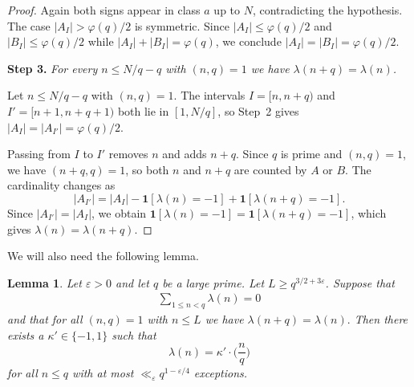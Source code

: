 \documentclass[11pt]{amsart}
\newtheorem{lemma}[theorem]{Lemma}
\begin{document}
\begin{proof}
Again both signs appear in class $a$ up to $N$,
contradicting the hypothesis.
The case $|A_I| > \varphi(q)/2$ is symmetric.
Since $|A_I| \leq \varphi(q)/2$ and $|B_I| \leq \varphi(q)/2$
while $|A_I| + |B_I| = \varphi(q)$,
we conclude $|A_I| = |B_I| = \varphi(q)/2$.

\medskip
\noindent\textbf{Step 3.}
\textit{For every $n \leq N/q - q$ with $(n,q) = 1$
we have $\lambda(n+q) = \lambda(n)$.}

\smallskip
Let $n \leq N/q - q$ with $(n, q) = 1$.
The intervals
$I = [n, n + q)$ and $I' = [n + 1, n + q + 1)$
both lie in $[1, N/q]$, so Step~2 gives
$|A_I| = |A_{I'}| = \varphi(q)/2$.

Passing from $I$ to $I'$ removes $n$ and adds $n + q$.
Since $q$ is prime and $(n, q) = 1$, we have
$(n + q, q) = 1$, so both $n$ and $n + q$ are counted
by $A$ or $B$.
The cardinality changes as
\[
|A_{I'}| = |A_I|
  - \mathbf{1}[\lambda(n) = -1]
  + \mathbf{1}[\lambda(n + q) = -1].
\]
Since $|A_{I'}| = |A_I|$, we obtain
$\mathbf{1}[\lambda(n) = -1] = \mathbf{1}[\lambda(n+q) = -1]$,
which gives $\lambda(n) = \lambda(n + q)$.
\end{proof}

We will also need the following lemma. 

\begin{lemma} \label{lem:dominant}
Let $\varepsilon > 0$  and let $q$ be a  
large prime. Let $L \geq q^{3/2 + 3\varepsilon}$. Suppose that 
\begin{align} \label{eq:sum_condition}
\sum_{1 \leq n < q} \lambda(n) = 0
\end{align}
and that for all $(n,q) = 1$ with $n \leq L$ we have $\lambda(n + q) = \lambda(n).$
Then there exists a $\kappa' \in \{-1,1\}$ such that 
$$
\lambda(n) = \kappa' \cdot \Big ( \frac{n}{q} \Big )
$$
for all $n \leq q$ with at most $\ll_\varepsilon q^{1 - \varepsilon / 4}$ exceptions. 

\end{lemma}
\end{document}
